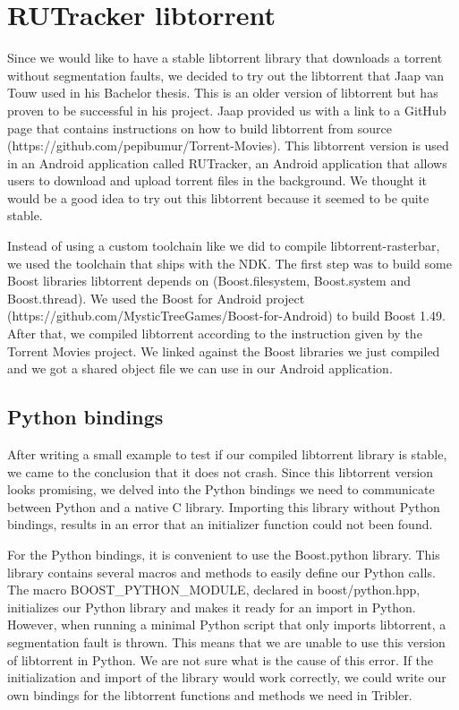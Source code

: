 	\section{RUTracker libtorrent}
		Since we would like to have a stable libtorrent library that downloads a torrent without segmentation faults, we decided to try out the libtorrent that Jaap van Touw used in his Bachelor thesis. This is an older version of libtorrent but has proven to be successful in his project. Jaap provided us with a link to a GitHub page that contains instructions on how to build libtorrent from source (https://github.com/pepibumur/Torrent-Movies). This libtorrent version is used in an Android application called RUTracker, an Android application that allows users to download and upload torrent files in the background. We thought it would be a good idea to try out this libtorrent because it seemed to be quite stable.
		
		Instead of using a custom toolchain like we did to compile libtorrent-rasterbar, we used the toolchain that ships with the NDK. The first step was to build some Boost libraries libtorrent depends on (Boost.filesystem, Boost.system and Boost.thread). We used the Boost for Android project (https://github.com/MysticTreeGames/Boost-for-Android) to build Boost 1.49. After that, we compiled libtorrent according to the instruction given by the Torrent Movies project. We linked against the Boost libraries we just compiled and we got a shared object file we can use in our Android application.
		
		\subsection{Python bindings}
			After writing a small example to test if our compiled libtorrent library is stable, we came to the conclusion that it does not crash. Since this libtorrent version looks promising, we delved into the Python bindings we need to communicate between Python and a native C library. Importing this library without Python bindings, results in an error that an initializer function could not been found.
		
			For the Python bindings, it is convenient to use the Boost.python library. This library contains several macros and methods to easily define our Python calls. The macro BOOST\_PYTHON\_MODULE, declared in boost/python.hpp, initializes our Python library and makes it ready for an import in Python. However, when running a minimal Python script that only imports libtorrent, a segmentation fault is thrown. This means that we are unable to use this version of libtorrent in Python. We are not sure what is the cause of this error. If the initialization and import of the library would work correctly, we could write our own bindings for the libtorrent functions and methods we need in Tribler.
			
